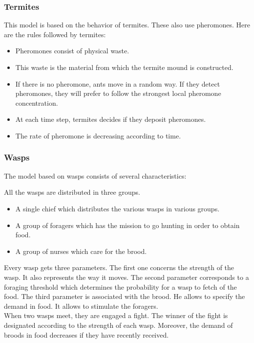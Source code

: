 \newpage

\subsubsection{Termites}

This model is based on the behavior of termites. These also use pheromones. Here are the rules followed by termites:

\begin{itemize}
\item Pheromones consist of physical waste.
\item This waste is the material from which the termite mound is constructed.
\item If there is no pheromone, ants move in a random way. If they detect pheromones, they will prefer to follow the strongest local pheromone concentration.
\item At each time step, termites decides if they deposit pheromones.
\item The rate of pheromone is decreasing according to time.
\end{itemize} 

\newpage

\subsubsection{Wasps}

The model based on wasps consists of several characteristics:

All the wasps are distributed in three groups.
\begin{itemize}
\item A single chief which distributes the various wasps in various groups.
\item A group of foragers which has the mission to go hunting in order to obtain food.
\item A group of nurses which care for the brood.
\end{itemize}

Every wasp gets three parameters. The first one concerns the strength of the wasp. It also represents the way it moves. The second parameter corresponds to a foraging threshold which determines the probability for a wasp to fetch of the food. The third parameter is associated with the brood. He allows to specify the demand in food. It allows to stimulate the foragers.\\
When two wasps meet, they are engaged a fight.
The winner of the fight is designated according to the strength of each wasp. Moreover, the demand of broods in food decreases if they have recently received.

